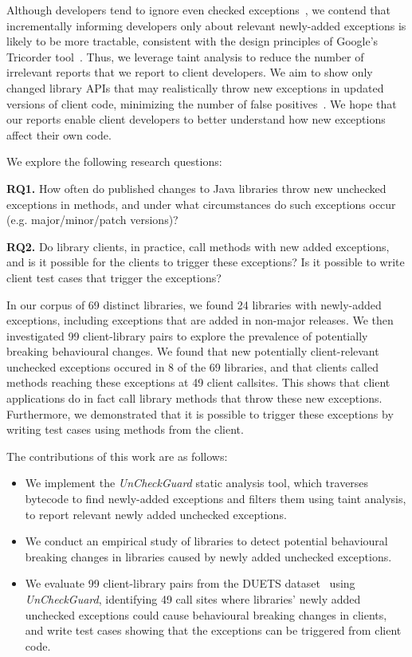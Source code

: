 Although developers tend to ignore even checked
exceptions~\cite{nakshatri16:_analy_java}, we contend that incrementally informing
developers only about relevant newly-added exceptions is likely to be more tractable, consistent with the
design principles of Google's Tricorder tool~\cite{sadowski15:_tricor}.
Thus, we leverage taint analysis
to reduce the number of irrelevant reports that we report to client developers.
We aim to show only changed library APIs that may realistically throw new exceptions
in updated versions of client code, minimizing the number of false positives~\cite{pashchenko20:_vuln4,pashchenko18:_vulner}.
We hope that our reports enable client developers to better understand how new exceptions affect their own code.

We explore the following research questions:

\noindent
{\bf RQ1.} How often do published changes to Java libraries throw new unchecked exceptions in methods,
and under what circumstances do such exceptions occur (e.g. major/minor/patch versions)?

\noindent
{\bf RQ2.} Do library clients, in practice, call methods with new added exceptions, and is it possible for the clients to trigger these exceptions? Is it possible to write client test cases that trigger the exceptions?

In our corpus of 69 distinct libraries, we found 24 libraries with newly-added exceptions, including exceptions that are added in non-major releases.
We then investigated 99 client-library pairs to explore the prevalence of potentially breaking behavioural changes.
We found that new potentially client-relevant unchecked exceptions occured in 8 of the 69 libraries, and that clients called methods reaching these exceptions at 49 client callsites.
This shows that client applications do in fact call library methods that throw these new exceptions.
Furthermore, we demonstrated that it is possible to trigger these exceptions by writing test cases using methods from the client.

The contributions of this work are as follows:

\begin{itemize}[noitemsep]
\item We implement the \textit{UnCheckGuard} static analysis tool, which traverses bytecode to find newly-added exceptions and filters them using taint analysis, to report relevant newly added unchecked exceptions.
\item We conduct an empirical study of libraries to detect potential behavioural breaking changes in libraries caused by newly added unchecked exceptions.
\item We evaluate 99 client-library pairs from the DUETS dataset~\cite{durieux21:_duets} using \textit{UnCheckGuard}, identifying 49 call sites where libraries' newly added unchecked exceptions could cause behavioural breaking changes in clients, and write test cases showing that the exceptions can be triggered from client code.
\end{itemize}

